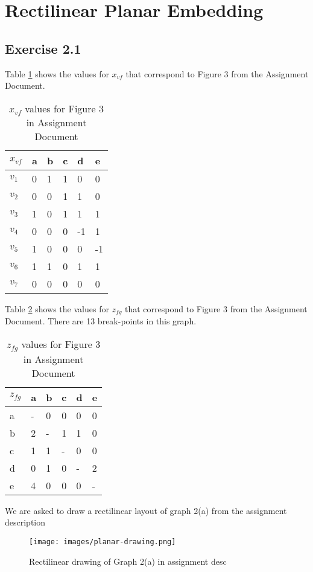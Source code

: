 \section{Rectilinear Planar Embedding}

\subsection{Exercise 2.1}

Table \ref{tab:Xvf} shows the values for {\(x_{vf}\)} that correspond to Figure 3 from the Assignment Document.

\begin{table}[h]
  \centering
  \begin{tabular}{l | l l l l l}
  \(x_{vf}\) & a & b & c & d  & e  \\
  \hline
  \(v_{1}\)  & 0 & 1 & 1 & 0  & 0  \\
  \(v_{2}\)  & 0 & 0 & 1 & 1  & 0  \\
  \(v_{3}\)  & 1 & 0 & 1 & 1  & 1  \\
  \(v_{4}\)  & 0 & 0 & 0 & -1 & 1  \\
  \(v_{5}\)  & 1 & 0 & 0 & 0  & -1 \\
  \(v_{6}\)  & 1 & 1 & 0 & 1  & 1  \\
  \(v_{7}\)  & 0 & 0 & 0 & 0  & 0
  \end{tabular}
  \caption{\(x_{vf}\) values for Figure 3 in Assignment Document}
  \label{tab:Xvf}
\end{table}


Table \ref{tab:Zvf} shows the values for \(z_{fg}\) that correspond to Figure 3 from the Assignment Document. There are 13 break-points in this graph. 

\begin{table}[h]
  \centering
  \begin{tabular}{l|lllll}
  \(z_{fg}\) & a & b & c & d & e \\\hline
  a     & - & 0 & 0 & 0 & 0 \\
  b     & 2 & - & 1 & 1 & 0 \\
  c     & 1 & 1 & - & 0 & 0 \\
  d     & 0 & 1 & 0 & - & 2 \\
  e     & 4 & 0 & 0 & 0 & - \\
  \end{tabular}
  \caption{\(z_{fg}\) values for Figure 3 in Assignment Document}
  \label{tab:Zvf}
\end{table}

We are asked to draw a rectilinear layout of graph 2(a) from the assignment description
\begin{figure}[ht]
  \centering
  \texttt{[image: images/planar-drawing.png]}
  \caption{Rectilinear drawing of Graph 2(a) in assignment desc}
  \label{fig:rectidraw}
\end{figure}


